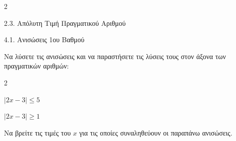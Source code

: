 \begin{ylh}{2}
    \item 2.3. Απόλυτη Τιμή Πραγματικού Αριθμού
    \item 4.1. Ανισώσεις 1ου Βαθμού
\end{ylh}

\begin{rlist}
\item Να λύσετε τις ανισώσεις και να παραστήσετε τις λύσεις τους στον άξονα των πραγματικών αριθμών:
\begin{multicols}{2}
\begin{alist}
\item $|2x - 3| \le 5$ 
\item $|2x - 3| \ge 1$ 
\end{alist}
\end{multicols}
\item Να βρείτε τις τιμές του $x$ για τις οποίες συναληθεύουν οι παραπάνω ανισώσεις. 
\end{rlist}

